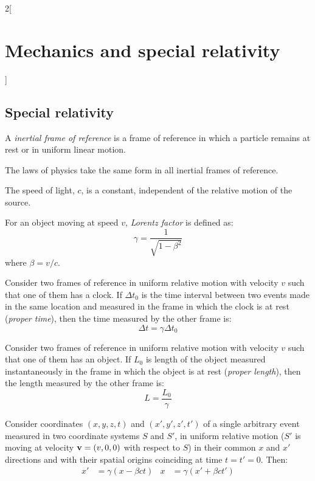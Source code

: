 \documentclass[../../../main.tex]{subfiles}
\begin{document}
\begin{multicols}{2}[\section{Mechanics and special relativity}]
  \subsection{Special relativity}
  \begin{definition}
    A \textit{inertial frame of reference} is a frame of reference in which a particle remains at rest or in uniform linear motion.
  \end{definition}
  \begin{principle}
    The laws of physics take the same form in all inertial frames of reference.
  \end{principle}
  \begin{principle}
    The speed of light, $c$, is a constant, independent of the relative motion of the source.
  \end{principle}
  \begin{definition}
    For an object moving at speed $v$, \textit{Lorentz factor} is defined as:
    $$\gamma=\frac{1}{\sqrt{1-\beta^2}}$$ where $\beta=v/c$.
  \end{definition}
  \begin{prop}
    Consider two frames of reference in uniform relative motion with velocity $v$ such that one of them has a clock. If $\Delta t_0$ is the time interval between two events made in the same location and measured in the frame in which the clock is at rest (\textit{proper time}), then the time measured by the other frame is:
    $$\Delta t=\gamma\Delta t_0$$
  \end{prop}
  \begin{prop}
    Consider two frames of reference in uniform relative motion with velocity $v$ such that one of them has an object. If $L_0$ is length of the object measured instantaneously in the frame in which the object is at rest (\textit{proper length}), then the length measured by the other frame is:
    $$L=\frac{L_0}{\gamma}$$
  \end{prop}
  \begin{prop}
    Consider coordinates $(x,y,z,t)$ and $(x',y',z',t')$ of a single arbitrary event measured in two coordinate systems $S$ and $S'$, in uniform relative motion ($S'$ is moving at velocity $\vb{v}=(v,0,0)$ with respect to $S$) in their common $x$ and $x'$ directions and  with their spatial origins coinciding at time $t=t'=0$. Then:
    \begin{align*}
      x'  & =\gamma(x-\beta ct) & x  & =\gamma(x'+\beta ct') \\

\end{align*}
\end{prop}
\end{multicols}
\end{document}

